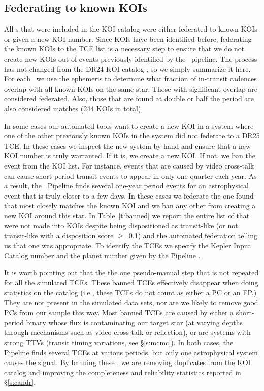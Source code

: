 \subsection{Federating to known KOIs}
\label{s:federation}
All \opstce s that were included in the KOI catalog were either federated to known KOIs or given a new KOI number. Since KOIs have been identified before, federating the known KOIs to the TCE list is a necessary step to ensure that we do not create new KOIs out of events previously identified by the \Kepler\ pipeline.  The process has not changed from the DR24 KOI catalog \citep[see \S4.2 of][]{Coughlin2016}, so we simply summarize it here.  For each \opstce\ we use the ephemeris to determine what fraction of in-transit cadences overlap with all known KOIs on the same star.  Those with significant overlap are considered federated.  Also, those that are found at double or half the period are also considered matches (244 KOIs in total).  

In some cases our automated tools want to create a new KOI in a system where one of the other previously known KOIs in the system did not federate to a DR25 TCE.  In these cases we inspect the new system by hand and ensure that a new KOI number is truly warranted. If it is, we create a new KOI. If not, we ban the event from the KOI list.  For instance, events that are caused by video cross-talk \citep{KIH} can cause short-period transit events to appear in only one quarter each year. As a result, the \Kepler\ Pipeline finds several one-year period events for an astrophysical event that is truly closer to a few days.  In these cases we federate the one found that most closely matches the known KOI and we ban any other  from creating a new KOI around this star. In Table~\ref{t:banned} we report the entire list of  that were not made into KOIs despite being dispositioned as transit-like (or not transit-like with a disposition score $\ge$~0.1) and the automated federation telling us that one was appropriate. To identify the TCEs we specify the Kepler Input Catalog number and the planet number given by the \Kepler{} Pipeline \citep{Twicken2016}.



It is worth pointing out that the  the one pseudo-manual step that is not repeated for all the simulated TCEs.  These banned TCEs effectively disappear when doing statistics on the catalog (i.e., these TCEs do not count as either a PC or an FP.) They are not present in the simulated data sets, nor are we likely to remove good PCs from our sample this way. Most banned TCEs are caused by either a short-period binary whose flux is contaminating our target star (at varying depths through mechanisms such as video cross-talk or reflection), or are systems with strong TTVs (transit timing variations, see \S\ref{s:mcmc}). In both cases, the Pipeline finds several TCEs at various periods, but only one astrophysical system causes the signal.  By banning these \opstces, we are removing duplicates from the KOI catalog and improving the completeness and reliability statistics reported in \S\ref{s:candr}.
